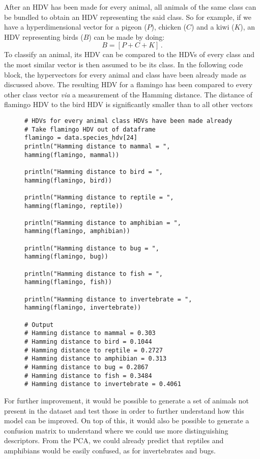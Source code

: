 After an HDV has been made for every animal, all animals of the same class can be bundled to obtain an HDV representing the said class. So for example, if we have a hyperdimensional vector for a pigeon ($P$), chicken ($C$) and a kiwi ($K$), an HDV representing birds ($B$) can be made by doing:
\begin{equation}
    B = [P + C + K]\,.
\end{equation} 
To classify an animal, its HDV can be compared to the HDVs of every class and the most similar vector is then assumed to be its class.  In the following code block, the hypervectors for every animal and class have been already made as discussed above. The resulting HDV for a flamingo has been compared to every other class vector \textit{via} a measurement of the Hamming distance. The distance of flamingo HDV to the bird HDV is significantly smaller than to all other vectors
\begin{figure}[H]
    \centering
\begin{verbatim}
# HDVs for every animal class HDVs have been made already
# Take flamingo HDV out of dataframe
flamingo = data.species_hdv[24]
println("Hamming distance to mammal = ",
hamming(flamingo, mammal))

println("Hamming distance to bird = ",
hamming(flamingo, bird))

println("Hamming distance to reptile = ",
hamming(flamingo, reptile))

println("Hamming distance to amphibian = ",
hamming(flamingo, amphibian))

println("Hamming distance to bug = ",
hamming(flamingo, bug))

println("Hamming distance to fish = ",
hamming(flamingo, fish))

println("Hamming distance to invertebrate = ",
hamming(flamingo, invertebrate))

# Output
# Hamming distance to mammal = 0.303
# Hamming distance to bird = 0.1044
# Hamming distance to reptile = 0.2727
# Hamming distance to amphibian = 0.313
# Hamming distance to bug = 0.2867
# Hamming distance to fish = 0.3484
# Hamming distance to invertebrate = 0.4061
\end{verbatim}
\end{figure}
For further improvement, it would be possible to generate a set of animals not present in the dataset and test those in order to further understand how this model can be improved. On top of this, it would also be possible to generate a confusion matrix to understand where we could use more distinguishing descriptors. From the PCA, we could already predict that reptiles and amphibians would be easily confused, as for invertebrates and bugs.
